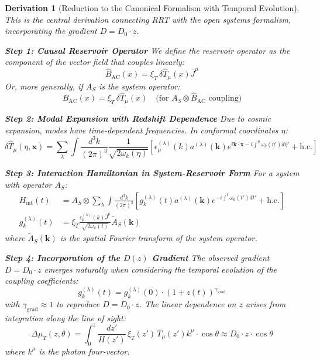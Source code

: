 \documentclass[10pt, a4paper]{article}
\newcommand{\xiT}{\xi_T}       %
\newtheorem{derivation}{Derivation}
\begin{document}
\begin{derivation}[Reduction to the Canonical Formalism with Temporal Evolution]
This is the central derivation connecting RRT with the open systems formalism, incorporating the gradient $D = D_0 \cdot z$.

\textbf{Step 1: Causal Reservoir Operator}
We define the reservoir operator as the component of the vector field that couples linearly:
\begin{equation}
\hat{B}_{\text{AC}}(x) = \xiT \, \delta\hat{T}_\mu(x) \bar{J}^\mu
\tag{8.1}
\end{equation}
Or, more generally, if $A_S$ is the system operator:
\begin{equation}
\hat{B}_{\text{AC}}(x) = \xiT \, \delta\hat{T}_\mu(x) \quad \text{(for $A_S \otimes \hat{B}_{\text{AC}}$ coupling)}
\tag{8.2}
\end{equation}

\textbf{Step 2: Modal Expansion with Redshift Dependence}
Due to cosmic expansion, modes have time-dependent frequencies. In conformal coordinates $\eta$:
\begin{equation}
\delta\hat{T}_\mu(\eta, \mathbf{x}) = \sum_{\lambda} \int \frac{d^3k}{(2\pi)^3} \frac{1}{\sqrt{2\omega_k(\eta)}} \left[ \epsilon_\mu^{(\lambda)}(k) a^{(\lambda)}(\mathbf{k}) e^{i\mathbf{k}\cdot\mathbf{x} - i\int^{\eta} \omega_k(\eta') d\eta'} + \text{h.c.} \right]
\tag{8.3}
\end{equation}

\textbf{Step 3: Interaction Hamiltonian in System-Reservoir Form}
For a system with operator $A_S$:
\begin{align}
H_{\text{int}}(t) &= A_S \otimes \sum_{\lambda} \int \frac{d^3k}{(2\pi)^3} \left[ g_k^{(\lambda)}(t) a^{(\lambda)}(\mathbf{k}) e^{-i\int^t \omega_k(t') dt'} + \text{h.c.} \right]
\tag{8.4} \\
g_k^{(\lambda)}(t) &= \xiT \frac{\epsilon_\mu^{(\lambda)}(k) \bar{J}^\mu}{\sqrt{2\omega_k(t)}} \tilde{A}_S(\mathbf{k})
\tag{8.5}
\end{align}
where $\tilde{A}_S(\mathbf{k})$ is the spatial Fourier transform of the system operator.

\textbf{Step 4: Incorporation of the $D(z)$ Gradient}
The observed gradient $D = D_0 \cdot z$ emerges naturally when considering the temporal evolution of the coupling coefficients:
\begin{equation}
g_k^{(\lambda)}(t) = g_k^{(\lambda)}(0) \cdot (1 + z(t))^{\gamma_{\text{grad}}}
\tag{8.6}
\end{equation}
with $\gamma_{\text{grad}} \approx 1$ to reproduce $D = D_0 \cdot z$. The linear dependence on $z$ arises from integration along the line of sight:
\begin{equation}
\Delta \mu_T(z, \theta) = \int_0^z \frac{dz'}{H(z')} \, \xiT(z') \, \bar{T}_\mu(z') k^\mu \cdot \cos\theta \approx D_0 \cdot z \cdot \cos\theta
\tag{8.7}
\end{equation}
where $k^\mu$ is the photon four-vector.


\end{derivation}
\end{document}
